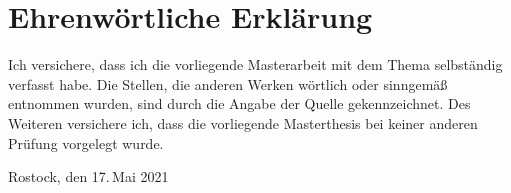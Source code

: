 \cleardoublepage
\blankpage
\cleartoevenpage[\thispagestyle{empty}]

\restorepagenumber

\setlength\bibitemsep{1ex}
\printbibliography
\cleardoublepage


\blankpage

\chapter*{Ehrenwörtliche Erklärung}

Ich versichere, dass ich die vorliegende Masterarbeit mit dem Thema \glqq \thetitle \grqq{} selbständig verfasst habe. Die Stellen, die anderen Werken wörtlich oder sinngemäß entnommen wurden, sind durch die Angabe der Quelle gekennzeichnet. Des Weiteren versichere ich, dass die vorliegende Masterthesis bei keiner anderen Prüfung vorgelegt wurde.

\vspace{-2ex}
\vspace{1cm}
Rostock, den 17.\,Mai 2021

\vspace{-2ex}
\vspace{2cm}
\begin{minipage}[b]{5.5cm}
   \dotfill\\%
    {\footnotesize \theauthor}%
\end{minipage}
\cleardoublepage
\blankpage
